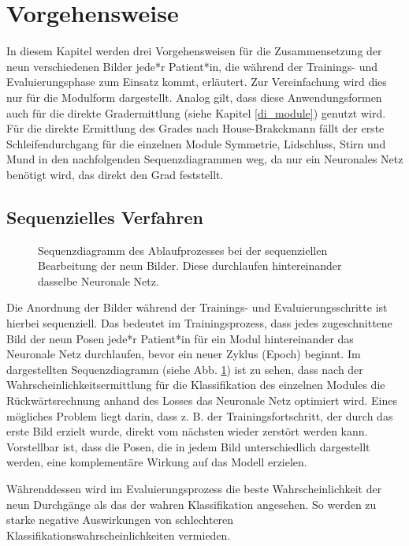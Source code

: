 \clearpage
\section{Vorgehensweise}\label{process}
In diesem Kapitel werden drei Vorgehensweisen für die Zusammensetzung der neun verschiedenen Bilder jede*r Patient*in, die während der Trainings- und Evaluierungsphase zum Einsatz kommt, erläutert. Zur Vereinfachung wird dies nur für die Modulform dargestellt. Analog gilt, dass diese Anwendungsformen auch für die direkte Gradermittlung (siehe Kapitel \ref{di_module}) genutzt wird. Für die direkte Ermittlung des Grades nach House-Brakckmann fällt der erste Schleifendurchgang für die einzelnen Module Symmetrie, Lidschluss, Stirn und Mund in den nachfolgenden Sequenzdiagrammen weg, da nur ein Neuronales Netz benötigt wird, das direkt den Grad feststellt.

\subsection{Sequenzielles Verfahren}\label{sequential_method}
\begin{figure}[!b]\centering
\makebox[0pt]{}
\caption[Sequenzdiagramm des Ablaufprozesses bei der sequenziellen Bearbeitung der neun Bilder]{Sequenzdiagramm des Ablaufprozesses bei der sequenziellen Bearbeitung der neun Bilder. Diese durchlaufen hintereinander dasselbe Neuronale Netz.}\label{cap:seq}
\end{figure}\label{fig:seq}

Die Anordnung der Bilder während der Trainings- und Evaluierungsschritte ist hierbei sequenziell. Das bedeutet im Trainingsprozess, dass jedes zugeschnittene Bild der neun Posen jede*r Patient*in für ein Modul hintereinander das Neuronale Netz durchlaufen, bevor ein neuer Zyklus (Epoch) beginnt. Im dargestellten Sequenzdiagramm (siehe Abb. \ref{cap:seq}) ist zu sehen, dass nach der Wahrscheinlichkeitsermittlung für die Klassifikation des einzelnen Modules die Rückwärtsrechnung anhand des Losses das Neuronale Netz optimiert wird. Eines mögliches Problem liegt darin, dass z. B. der Trainingsfortschritt, der durch das erste Bild erzielt wurde, direkt vom nächsten wieder zerstört werden kann. Vorstellbar ist, dass die Posen, die in jedem Bild unterschiedlich dargestellt werden, eine komplementäre Wirkung auf das Modell erzielen.

Währenddessen wird im Evaluierungsprozess die beste Wahrscheinlichkeit der neun Durchgänge als das der wahren Klassifikation angesehen. So werden zu starke negative Auswirkungen von schlechteren Klassifikationswahrscheinlichkeiten vermieden.

